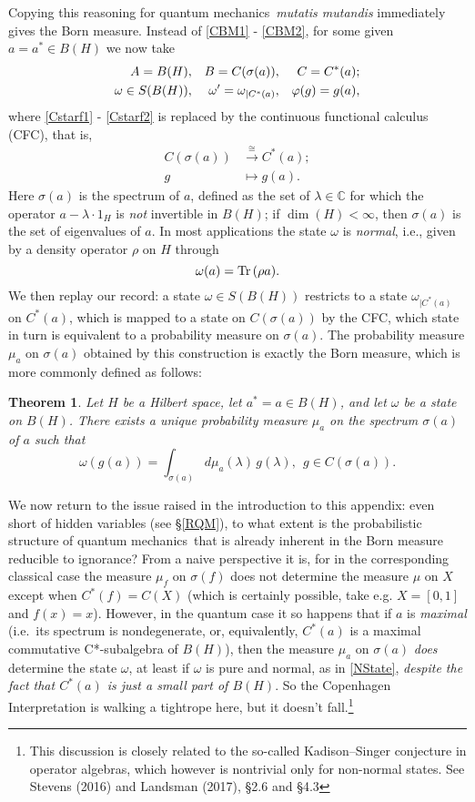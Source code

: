 \documentclass[11pt,a4paper]{article}
\numberwithin{equation}{section}
\newcommand{\qm}{quantum mechanics}
\newcommand{\er}{\eqref}
\newcommand{\raw}{\rightarrow}
\newcommand{\Hs}{Hilbert space} \newcommand{\Bs}{Banach space}
\newcommand{\lm}{\lambda} \newcommand{\Lm}{\Lambda}
\newcommand{\rh}{\rho} \newcommand{\sg}{\sigma}
\newcommand{\om}{\omega} \newcommand{\Om}{\Omega}
\newcommand{\Tr}{\mbox{\rm Tr}\,}
\newcommand{\C}{{\mathbb C}}
\newtheorem{theorem}[definition]{Theorem}
\begin{document}
Copying this reasoning for \qm\  \emph{mutatis mutandis} immediately gives the Born measure. Instead of \er{CBM1} - \er{CBM2}, for some given $a=a^*\in B(H)$ we now take
\begin{align}
A=B(H), && B=C(\sg(a)), && C= C^*(a); \label{QBM1} 
\\  \om\in S(B(H)), && \om'=\om_{|C^*(a)}, && \phv(g)=g (a),\label{QBM2}
\end{align}
where  \er{Cstarf1} - \er{Cstarf2} is replaced by the  continuous functional calculus (CFC), that is, 
\begin{align}
C(\sg(a))&\stackrel{\cong}{\raw} C^*(a); \label{CFC1}\\
g&\mapsto g(a).\label{CFC2}
\end{align} 
Here $\sg(a)$ is the spectrum of $a$, defined as the set of $\lm\in\C$ for which the operator $a-\lm\cdot 1_H$ is \emph{not} invertible in $B(H)$; if $\dim(H)<\infty$, then $\sg(a)$ is the set of eigenvalues of $a$. In most applications the state $\om$ is \emph{normal}, i.e., given by a density operator $\rh$ on $H$ through
\begin{equation}
\om(a)=\Tr(\rh a).  \label{NState}
\end{equation}
We then replay our record: a state $\om\in S(B(H))$ restricts to a state $\om_{|C^*(a)}$ on $C^*(a)$, which is mapped to a state on $C(\sg(a))$ by the CFC, which state in turn is equivalent to a  probability measure on $\sg(a)$.
The probability measure $\mu_a$ on $\sg(a)$ obtained by this construction is exactly the Born measure, which is  more commonly defined as follows:
 \begin{theorem}\label{defBornmu}
 Let $H$ be a \Hs, let $a^*=a\in B(H)$, and let $\om$ be a state on $B(H)$.
  There exists a unique probability measure 
 $\mu_a$ on the spectrum $\sg(a)$ of $a$ such that 
 \begin{equation}
\om(g(a))=\int_{\sg(a)} d\mu_a(\lm)\, g(\lm), \:\: g\in C(\sg(a)).\label{BornfromGelfand}
\end{equation}
  \end{theorem}
We now return to the issue raised in the introduction to this appendix: even short of hidden variables (see \S\ref{RQM}), to what extent is the probabilistic structure of \qm\ that is already inherent in the Born measure  reducible to ignorance? From a naive perspective it is, for in the corresponding classical case the measure $\mu_f$ on $\sg(f)$ does not determine the measure $\mu$ on $X$ except when $C^*(f)=C(X)$ (which is certainly possible, take e.g. $X=[0,1]$ and $f(x)=x$). However, in the quantum case it so happens that if $a$ is \emph{maximal} (i.e.\ its spectrum is nondegenerate, or, equivalently, $C^*(a)$ is a maximal commutative C*-subalgebra of $B(H)$), then the measure $\mu_a$ on $\sg(a)$ \emph{does} determine the state $\om$, at least if $\om$ is pure and normal, as in \er{NState}, \emph{despite the fact that $C^*(a)$ is just a small part of $B(H)$}.
So the Copenhagen Interpretation is walking a tightrope here, but it doesn't fall.\footnote{This discussion is closely related to the so-called Kadison--Singer conjecture in operator algebras, which however is nontrivial only for non-normal states. 
See Stevens (2016) and Landsman (2017), \S 2.6 and \S 4.3  }
\end{document}
